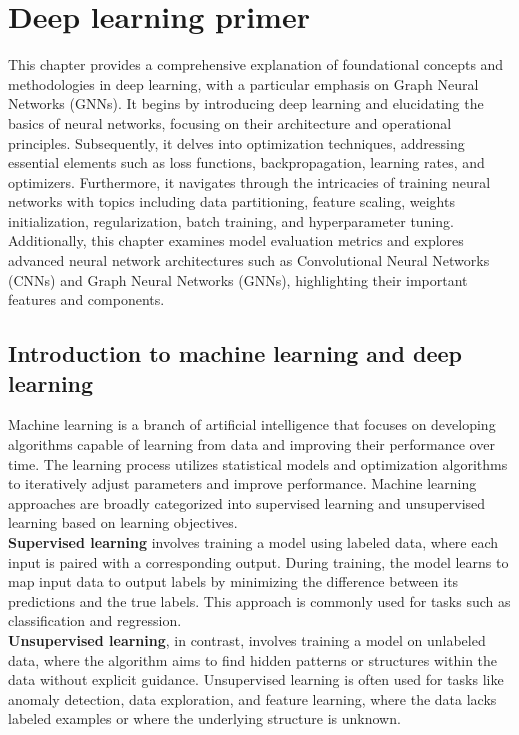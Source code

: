 \chapter{Deep learning primer}
\label{chap:Theory-Deep Learning}
This chapter provides a comprehensive explanation of foundational concepts and methodologies in deep learning, with a particular emphasis on Graph Neural Networks (GNNs). It begins by introducing deep learning and elucidating the basics of neural networks, focusing on their architecture and operational principles. Subsequently, it delves into optimization techniques, addressing essential elements such as loss functions, backpropagation, learning rates, and optimizers. Furthermore, it navigates through the intricacies of training neural networks with topics including data partitioning, feature scaling, weights initialization, regularization, batch training, and hyperparameter tuning. Additionally, this chapter examines model evaluation metrics and explores advanced neural network architectures such as Convolutional Neural Networks (CNNs) and Graph Neural Networks (GNNs), highlighting their important features and components. 

\section{Introduction to machine learning and deep learning}
Machine learning is a branch of artificial intelligence that focuses on developing algorithms capable of learning from data and improving their performance over time. The learning process utilizes statistical models and optimization algorithms to iteratively adjust parameters and improve performance. Machine learning approaches are broadly categorized into supervised learning and unsupervised learning based on learning objectives. \\

\textbf{Supervised learning} involves training a model using labeled data, where each input is paired with a corresponding output. During training, the model learns to map input data to output labels by minimizing the difference between its predictions and the true labels. This approach is commonly used for tasks such as classification and regression. \\

\textbf{Unsupervised learning}, in contrast, involves training a model on unlabeled data, where the algorithm aims to find hidden patterns or structures within the data without explicit guidance. Unsupervised learning is often used for tasks like anomaly detection, data exploration, and feature learning, where the data lacks labeled examples or where the underlying structure is unknown. \\

